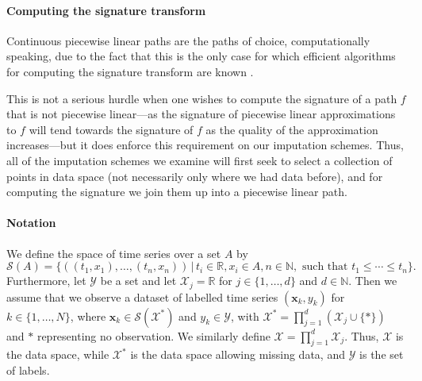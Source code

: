 \documentclass{article}
\newcommand{\reals}{\mathbb{R}}
\newcommand{\naturals}{\mathbb{N}}
\newcommand{\dataspace}{\mathcal{X}}
\newcommand{\lspace}{\mathcal{Y}}
\newcommand{\seriesspace}{\mathcal{S}}
\begin{document}
\paragraph{Computing the signature transform} \label{sec: computing sig}
Continuous piecewise linear paths are the paths of choice, computationally speaking, due to the fact that this is the only case for which efficient algorithms for computing the signature transform are known \cite{signatory}.

This is not a serious hurdle when one wishes to compute the signature of a path $f$ that is not piecewise linear---as the signature of piecewise linear approximations to $f$ will tend towards the signature of $f$ as the quality of the approximation increases---but it does enforce this requirement on our imputation schemes.
Thus, all of the imputation schemes we examine will first seek to select a collection of points in data space (not necessarily only where we had data before), and for computing the signature we join them up into a piecewise linear path.

\paragraph{Notation}
%
We define the space of time series over a set $A$ by
%
\begin{equation}
    \seriesspace(A) = \{((t_1, x_1), \ldots, (t_n, x_n)) \,\vert\, t_i \in \reals, x_i \in A, n \in \naturals, \text{ such that } t_1 \leq \cdots \leq t_n\}.\label{eq:seriesspace}
\end{equation}
%
Furthermore, let $\lspace$ be a set and let $\dataspace_j = \reals$ for $j \in \{1,
\ldots, d\}$ and $d \in \naturals$. Then we assume that we observe
a dataset of labelled time series $(\mathbf{x}_k, y_k)$ for $k \in \{1,
\ldots, N\}$, where $\mathbf{x}_k \in \seriesspace(\dataspace^*)$ and
$y_k \in \lspace$, with $\dataspace^* = \prod_{j = 1}^d(\dataspace_j
\cup \{*\})$ and $*$ representing no observation.
%
We similarly define $\dataspace = \prod_{j = 1}^d\dataspace_j$. Thus,
$\dataspace$ is the data space, while $\dataspace^*$ is the data space
allowing missing data, and $\lspace$ is the set of labels.
\end{document}
